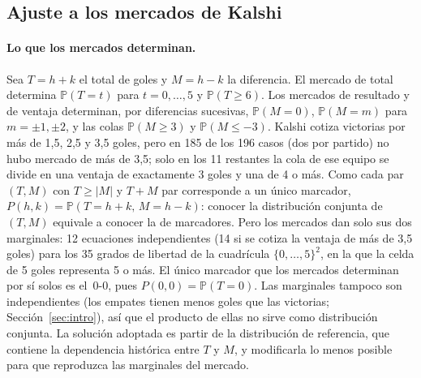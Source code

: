 \documentclass[12pt]{article}
\theoremstyle{plain}
\theoremstyle{remark}
\newcommand{\Prob}{\mathbb{P}}
\begin{document}
\subsection{Ajuste a los mercados de Kalshi}
\label{sec:kalshi}

\paragraph{Lo que los mercados determinan.}
Sea $T = h + k$ el total de goles y $M = h - k$ la diferencia.
El mercado de total determina $\Prob(T = t)$ para $t = 0, \ldots, 5$
y $\Prob(T \geq 6)$.
Los mercados de resultado y de ventaja determinan, por diferencias
sucesivas, $\Prob(M = 0)$, $\Prob(M = m)$ para $m = \pm 1, \pm 2$, y
las colas $\Prob(M \geq 3)$ y $\Prob(M \leq -3)$.
Kalshi cotiza victorias por más de 1,5, 2,5 y 3,5 goles, pero en 185
de los 196 casos (dos por partido) no hubo mercado de más de 3,5; solo
en los 11 restantes la cola de ese equipo se divide en una ventaja de
exactamente 3 goles y una de 4 o más.
Como cada par $(T, M)$ con $T \geq |M|$ y $T + M$ par corresponde a un
único marcador, $P(h, k) = \Prob(T = h + k,\, M = h - k)$: conocer la
distribución conjunta de $(T, M)$ equivale a conocer la de marcadores.
Pero los mercados dan solo sus dos marginales: 12 ecuaciones
independientes (14 si se cotiza la ventaja de más de 3,5 goles) para
los 35 grados de libertad de la cuadrícula $\{0, \ldots, 5\}^2$, en
la que la celda de 5 goles representa 5 o más.
El único marcador que los mercados determinan por sí solos es el~0-0,
pues $P(0, 0) = \Prob(T = 0)$.
Las marginales tampoco son independientes (los empates tienen menos
goles que las victorias; Sección~\ref{sec:intro}), así que el producto
de ellas no sirve como distribución conjunta.
La solución adoptada es partir de la distribución de referencia, que
contiene la dependencia histórica entre $T$ y $M$, y modificarla lo
menos posible para que reproduzca las marginales del mercado.
\end{document}
